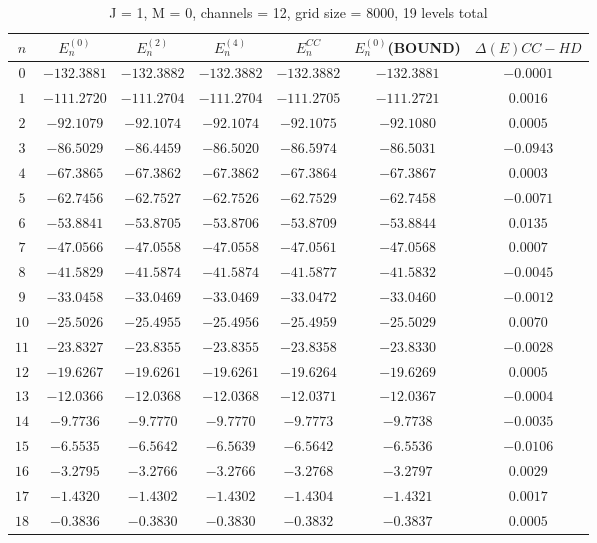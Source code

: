 \documentclass[12pt]{article}
\begin{document}
\begin{table}[H]
    \centering
    \caption{J = 1, M = 0, channels = 12, grid size = 8000, 19 levels total}
    \begin{tabular}{ccccccc}
        \toprule
        $n$ & $E_n^{(0)}$ & $E_n^{(2)}$ & $E_n^{(4)}$ & $E_n^{CC}$ & $E_n^{(0)}$(BOUND) & $\Delta(E) CC-HD$ \\
        \midrule
          $0$  & $-132.3881$ & $-132.3882$ & $-132.3882$ & $-132.3882$ & $-132.3881$ & $-0.0001$ \\ 
          $1$  & $-111.2720$ & $-111.2704$ & $-111.2704$ & $-111.2705$ & $-111.2721$ & $0.0016$  \\
          $2$  & $-92.1079$ & $-92.1074$ & $-92.1074$ & $-92.1075$  & $-92.1080$     & $0.0005$  \\      
          $3$  & $-86.5029$ & $-86.4459$ & $-86.5020$ & $-86.5974$  & $-86.5031$     & $-0.0943$ \\  
          $4$  & $-67.3865$ & $-67.3862$ & $-67.3862$ & $-67.3864$  & $-67.3867$     & $0.0003$  \\ 
          $5$  & $-62.7456$ & $-62.7527$ & $-62.7526$ & $-62.7529$  & $-62.7458$     & $-0.0071$ \\
          $6$  & $-53.8841$ & $-53.8705$ & $-53.8706$ & $-53.8709$  & $-53.8844$     & $0.0135$  \\
          $7$  & $-47.0566$ & $-47.0558$ & $-47.0558$ & $-47.0561$  & $-47.0568$     & $0.0007$  \\
          $8$  & $-41.5829$ & $-41.5874$ & $-41.5874$ & $-41.5877$  & $-41.5832$     & $-0.0045$\\ 
          $9$  & $-33.0458$ & $-33.0469$ & $-33.0469$ & $-33.0472$  & $-33.0460$     & $-0.0012$\\
          $10$ & $-25.5026$ & $-25.4955$ & $-25.4956$ & $-25.4959$  & $-25.5029$     & $0.0070$ \\
          $11$ & $-23.8327$ & $-23.8355$ & $-23.8355$ & $-23.8358$  & $-23.8330$     & $-0.0028$\\
          $12$ & $-19.6267$ & $-19.6261$ & $-19.6261$ & $-19.6264$  & $-19.6269$     & $0.0005$ \\ 
          $13$ & $-12.0366$ & $-12.0368$ & $-12.0368$ & $-12.0371$  & $-12.0367$     & $-0.0004$\\
          $14$ & $-9.7736$ & $-9.7770$ & $-9.7770$ & $-9.7773$  & $-9.7738$          & $-0.0035$\\
          $15$ & $-6.5535$ & $-6.5642$ & $-6.5639$ & $-6.5642$  & $-6.5536$          & $-0.0106$\\
          $16$ & $-3.2795$ & $-3.2766$ & $-3.2766$ & $-3.2768$  & $-3.2797$          & $0.0029$ \\ 
          $17$ & $-1.4320$ & $-1.4302$ & $-1.4302$ & $-1.4304$  & $-1.4321$          & $0.0017$ \\
          $18$ & $-0.3836$ & $-0.3830$ & $-0.3830$ & $-0.3832$  & $-0.3837$          & $0.0005$ \\
       \bottomrule                                                                             
    \end{tabular}
\end{table}
\end{document}
